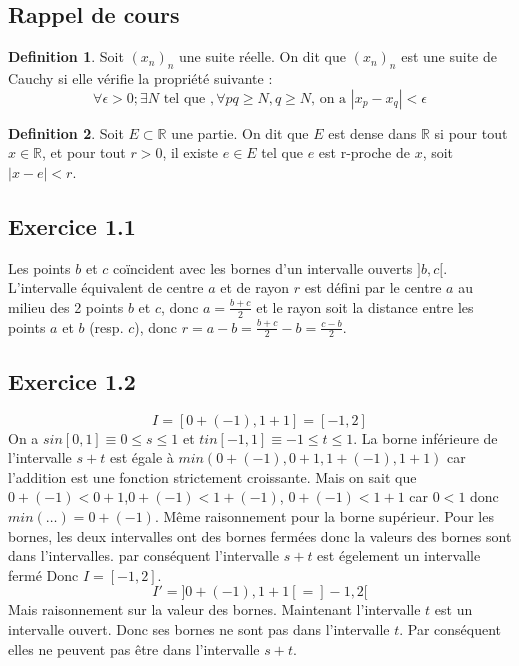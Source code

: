\documentclass[]{book}
\theoremstyle{definition}
\newtheorem{defn}{Definition}
\newcommand{\bb}[1]{\mathbb{#1}}
\newcommand{\R}{\bb{R}}
\begin{document}
\subsection*{Rappel de cours}

\begin{defn}
Soit $(x_n)_n$ une suite r\'eelle. On dit que $(x_n)_n$ est une suite de Cauchy si elle v\'erifie la propri\'et\'e suivante :
$$\forall \epsilon > 0; \exists N \text{ tel que }, \forall p q \geq N, q \geq N \text{, on a } |x_p - x_q| < \epsilon$$
\end{defn}

\begin{defn}
Soit $E \subset \R$ une partie. On dit que $E$ est dense dans $\R$ si pour tout $x \in \R$, et pour tout $r > 0$, il existe $e \in E$ tel que $e$ est r-proche de $x$, soit $|x - e| < r$.
\end{defn}


\newpage
\subsection*{Exercice 1.1}



Les points $b$ et $c$ co\"incident avec les bornes d'un intervalle ouverts $]b,c[$. L'intervalle \'equivalent de centre $a$ et de rayon $r$ est d\'efini par  le centre $a$ au milieu des 2 points $b$ et $c$, donc $a = \frac{b+c}{2}$ et le rayon soit la distance entre les points $a$ et $b$ (resp. $c$), donc $r=a-b=\frac{b+c}{2}-b = \frac{c-b}{2}$. 


\subsection*{Exercice 1.2}
$$I=[0+(-1),1+1] = [-1,2]$$
On a $s in [0,1] \equiv 0 \leq s \leq 1$ et $t in [-1,1] \equiv -1 \leq t \leq 1$. La borne inf\'erieure de l'intervalle $s+t$ est \'egale \`a $min(0+(-1), 0+1, 1+(-1), 1+1)$ car l'addition est une fonction strictement croissante. Mais on sait que $0+(-1)<0+1$,$0+(-1)<1+(-1)$, $0+(-1)<1+1$ car $0<1$ donc $min(\ldots) = 0+(-1)$. M\^eme raisonnement pour la borne sup\'erieur. Pour les bornes, les deux intervalles ont des bornes ferm\'ees donc la valeurs des bornes sont dans l'intervalles. par cons\'equent l'intervalle $s+t$ est \'egelement un intervalle ferm\'e Donc $I = [-1,2]$.    
$$I'=]0+(-1),1+1[ = ]-1,2[$$
Mais raisonnement sur la valeur des bornes. Maintenant l'intervalle $t$ est un intervalle ouvert. Donc ses bornes ne sont pas dans l'intervalle $t$. Par cons\'equent elles ne peuvent pas \^etre dans l'intervalle $s+t$. 
\end{document}

